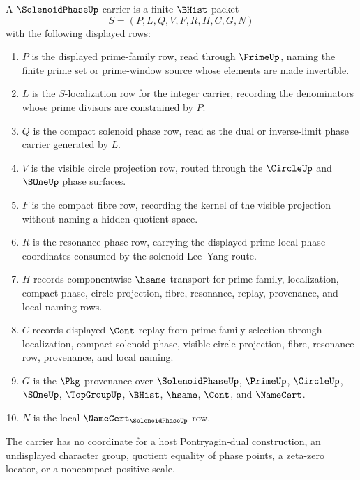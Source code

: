 \begin{definition}
\label{def:solenoid-phase-carrier}
A $\SolenoidPhaseUp$ carrier is a finite $\BHist$ packet
$$
S=(P,L,Q,V,F,R,H,C,G,N)
$$
with the following displayed rows:
\begin{enumerate}
\item $P$ is the displayed prime-family row, read through $\PrimeUp$, naming the finite prime set or prime-window source whose elements are made invertible.
\item $L$ is the $S$-localization row for the integer carrier, recording the denominators whose prime divisors are constrained by $P$.
\item $Q$ is the compact solenoid phase row, read as the dual or inverse-limit phase carrier generated by $L$.
\item $V$ is the visible circle projection row, routed through the $\CircleUp$ and $\SOneUp$ phase surfaces.
\item $F$ is the compact fibre row, recording the kernel of the visible projection without naming a hidden quotient space.
\item $R$ is the resonance phase row, carrying the displayed prime-local phase coordinates consumed by the solenoid Lee--Yang route.
\item $H$ records componentwise $\hsame$ transport for prime-family, localization, compact phase, circle projection, fibre, resonance, replay, provenance, and local naming rows.
\item $C$ records displayed $\Cont$ replay from prime-family selection through localization, compact solenoid phase, visible circle projection, fibre, resonance row, provenance, and local naming.
\item $G$ is the $\Pkg$ provenance over $\SolenoidPhaseUp$, $\PrimeUp$, $\CircleUp$, $\SOneUp$, $\TopGroupUp$, $\BHist$, $\hsame$, $\Cont$, and $\NameCert$.
\item $N$ is the local $\NameCert_{\SolenoidPhaseUp}$ row.
\end{enumerate}
The carrier has no coordinate for a host Pontryagin-dual construction, an undisplayed character group, quotient equality of phase points, a zeta-zero locator, or a noncompact positive scale.
\end{definition}

